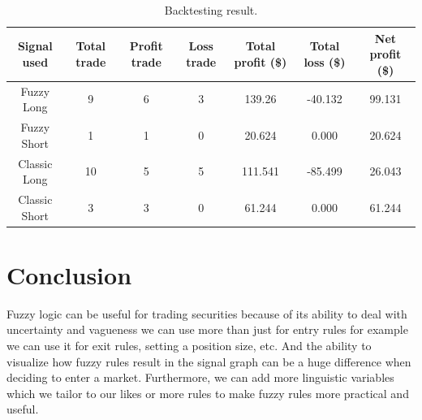 \documentclass{article}
\begin{document}
\begin{table}[htp]
	\centering
	\begin{tabular}{c c c c c c c}
		\toprule
        {Signal used} & {Total trade} & {Profit trade} & {Loss trade} & {Total profit (\$)} & {Total loss (\$)} & {Net profit (\$)} \\ 
        \midrule
        Fuzzy Long & 9 & 6 & 3 & 139.26 & -40.132 & 99.131 \\
        Fuzzy Short & 1 & 1 & 0 & 20.624 & 0.000 & 20.624 \\
        Classic Long & 10 & 5 & 5 & 111.541 & -85.499 & 26.043 \\
        Classic Short & 3 & 3 & 0 & 61.244 & 0.000 & 61.244 \\
        \bottomrule
    \end{tabular} 
    \caption{Backtesting result.}
	\label{table:4}
\end{table}
\FloatBarrier

\section*{Conclusion}
Fuzzy logic can be useful for trading securities because of its ability to deal with uncertainty and vagueness
we can use more than just for entry rules for example we can use it for exit rules, setting a position size,
etc. And the ability to visualize how fuzzy rules result in the signal graph can be a huge difference when
deciding to enter a market. Furthermore, we can add more linguistic variables which we tailor to our likes
or more rules to make fuzzy rules more practical and useful.


\newpage
\printbibliography


\end{document}
